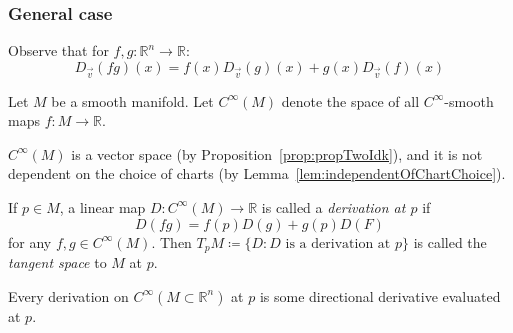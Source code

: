 \subsubsection*{General case}
Observe that for $f, g : \mathbb{R}^n \to \mathbb{R}$:
\[ 
    D_{\vec{v}} (fg)(x) = f(x) D_{\vec{v}}(g)(x) + 
    g(x) D_{\vec{v}}(f)(x) 
\]
\begin{definition}
    Let $M$ be a smooth manifold. 
    Let $C^\infty(M)$ denote the space of all $C^\infty$-smooth maps 
    $f: M \to \mathbb{R}$.
\end{definition}
\begin{remark}
    $C^\infty(M)$ is a vector space (by Proposition~\ref{prop:propTwoIdk}),
    and it is not dependent on the choice of charts
    (by Lemma~\ref{lem:independentOfChartChoice}).
\end{remark}
\begin{definition}
    If $p \in M$, a linear map $D : C^\infty(M) \to \mathbb{R}$ is called a
    \textit{derivation at $p$} if 
    \[ D(fg) = f(p) D(g) + g(p) D(F) \]
    for any $f, g \in C^\infty(M)$.
    Then $T_p M \coloneqq \{D : D \text{ is a derivation at } p \}$
    is called the \textit{tangent space} to $M$ at $p$.
\end{definition}
\begin{lemma}
    Every derivation on $C^\infty(M \subset \mathbb{R}^n)$ at $p$ is some directional
    derivative evaluated at $p$.
\end{lemma}